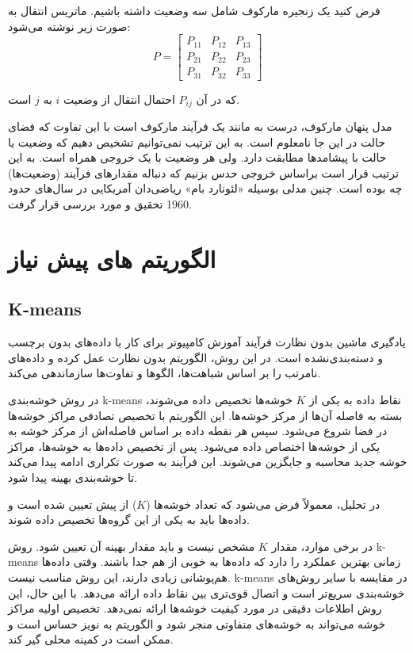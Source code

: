 \documentclass[a4paper,12pt,openany]{report}
\begin{document}
\begin{description}
		فرض کنید یک زنجیره مارکوف شامل سه وضعیت داشته باشیم. ماتریس انتقال به صورت زیر نوشته می‌شود:
		\[
		P = \begin{bmatrix}
			P_{11} & P_{12} & P_{13} \\
			P_{21} & P_{22} & P_{23} \\
			P_{31} & P_{32} & P_{33}
		\end{bmatrix}
		\]
	
	که در آن \( P_{ij} \) احتمال انتقال از وضعیت \( i \) به \( j \) است.
	
	مدل پنهان مارکوف، درست به مانند یک فرآیند مارکوف است با این تفاوت که فضای حالت در این جا نامعلوم است. به این ترتیب نمی‌توانیم تشخیص دهیم که وضعیت یا حالت با پیشامدها مطابقت دارد. ولی هر وضعیت با یک خروجی همراه است. به این ترتیب قرار است براساس خروجی حدس بزنیم که دنباله مقدارهای فرآیند (وضعیت‌ها) چه بوده است. چنین مدلی بوسیله «لئونارد بام» ریاضی‌دان آمریکایی در سال‌های حدود 1960 تحقیق و مورد بررسی قرار گرفت.
		
	\end{description}
	
		\section{الگوریتم های پیش نیاز}
	   \subsection{K-means}
	   
	 
	   
	   یادگیری ماشین بدون نظارت فرآیند آموزش کامپیوتر برای کار با داده‌های بدون برچسب و دسته‌بندی‌نشده است. در این روش، الگوریتم بدون نظارت عمل کرده و داده‌های نامرتب را بر اساس شباهت‌ها، الگوها و تفاوت‌ها سازماندهی می‌کند. 
	   
	   در روش خوشه‌بندی k-means نقاط داده به یکی از \( K \) خوشه‌ها تخصیص داده می‌شوند، بسته به فاصله آن‌ها از مرکز خوشه‌ها. این الگوریتم با تخصیص تصادفی مراکز خوشه‌ها در فضا شروع می‌شود. سپس هر نقطه داده بر اساس فاصله‌اش از مرکز خوشه به یکی از خوشه‌ها اختصاص داده می‌شود. پس از تخصیص داده‌ها به خوشه‌ها، مراکز خوشه جدید محاسبه و جایگزین می‌شوند. این فرآیند به صورت تکراری ادامه پیدا می‌کند تا خوشه‌بندی بهینه پیدا شود.
	   
	   در تحلیل، معمولاً فرض می‌شود که تعداد خوشه‌ها (\( K \)) از پیش تعیین شده است و داده‌ها باید به یکی از این گروه‌ها تخصیص داده شوند. 
	   
	   در برخی موارد، مقدار \( K \) مشخص نیست و باید مقدار بهینه آن تعیین شود. روش k-means زمانی بهترین عملکرد را دارد که داده‌ها به خوبی از هم جدا باشند. وقتی داده‌ها هم‌پوشانی زیادی دارند، این روش مناسب نیست. k-means در مقایسه با سایر روش‌های خوشه‌بندی سریع‌تر است و اتصال قوی‌تری بین نقاط داده ارائه می‌دهد. با این حال، این روش اطلاعات دقیقی در مورد کیفیت خوشه‌ها ارائه نمی‌دهد. تخصیص اولیه مراکز خوشه می‌تواند به خوشه‌های متفاوتی منجر شود و الگوریتم به نویز حساس است و ممکن است در کمینه محلی گیر کند.
	   
\end{document}
